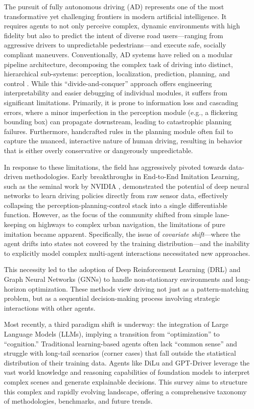 \documentclass[12pt, a4paper]{article}
\begin{document}
The pursuit of fully autonomous driving (AD) represents one of the most transformative yet challenging frontiers in modern artificial intelligence. It requires agents to not only perceive complex, dynamic environments with high fidelity but also to predict the intent of diverse road users—ranging from aggressive drivers to unpredictable pedestrians—and execute safe, socially compliant maneuvers. Conventionally, AD systems have relied on a modular pipeline architecture, decomposing the complex task of driving into distinct, hierarchical sub-systems: perception, localization, prediction, planning, and control \citep{caesar2021nuplan}. While this ``divide-and-conquer'' approach offers engineering interpretability and easier debugging of individual modules, it suffers from significant limitations. Primarily, it is prone to information loss and cascading errors, where a minor imperfection in the perception module (e.g., a flickering bounding box) can propagate downstream, leading to catastrophic planning failures. Furthermore, handcrafted rules in the planning module often fail to capture the nuanced, interactive nature of human driving, resulting in behavior that is either overly conservative or dangerously unpredictable.

In response to these limitations, the field has aggressively pivoted towards data-driven methodologies. Early breakthroughs in End-to-End Imitation Learning, such as the seminal work by NVIDIA \citep{bojarski2016end}, demonstrated the potential of deep neural networks to learn driving policies directly from raw sensor data, effectively collapsing the perception-planning-control stack into a single differentiable function. However, as the focus of the community shifted from simple lane-keeping on highways to complex urban navigation, the limitations of pure imitation became apparent. Specifically, the issue of \textit{covariate shift}—where the agent drifts into states not covered by the training distribution—and the inability to explicitly model complex multi-agent interactions necessitated new approaches.

This necessity led to the adoption of Deep Reinforcement Learning (DRL) \citep{kiran2021deep} and Graph Neural Networks (GNNs) \citep{gao2020vectornet} to handle non-stationary environments and long-horizon optimization. These methods view driving not just as a pattern-matching problem, but as a sequential decision-making process involving strategic interactions with other agents.

Most recently, a third paradigm shift is underway: the integration of Large Language Models (LLMs), implying a transition from ``optimization'' to ``cognition.'' Traditional learning-based agents often lack ``common sense'' and struggle with long-tail scenarios (corner cases) that fall outside the statistical distribution of their training data. Agents like DiLu \citep{wen2023dilu} and GPT-Driver \citep{mao2023gpt} leverage the vast world knowledge and reasoning capabilities of foundation models to interpret complex scenes and generate explainable decisions. This survey aims to structure this complex and rapidly evolving landscape, offering a comprehensive taxonomy of methodologies, benchmarks, and future trends.
\end{document}
